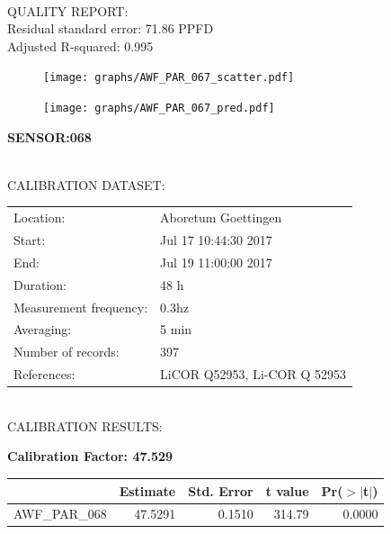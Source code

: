 \documentclass[oneside]{report}
\begin{document}
\hrulefill\\
QUALITY REPORT:\\
Residual standard error: 71.86 PPFD\\
Adjusted R-squared: 0.995



\begin{figure}[H]
  \centering
  \texttt{[image: graphs/AWF\_PAR\_067\_scatter.pdf]}
\end{figure}




\begin{figure}[H]
  \centering
  \texttt{[image: graphs/AWF\_PAR\_067\_pred.pdf]}
\end{figure}

\pagebreak


\begin{center}
\large{\textbf{SENSOR:068}}\\
\end{center}

\hrulefill\\
CALIBRATION DATASET:\\
\begin{table}[h!]
  \centering
  \label{tab:table1}
  \begin{tabular}{ll}
    Location: & Aboretum Goettingen\\ 
    
    
    Start:  & Jul 17 10:44:30 2017 \\
    End:   & Jul 19 11:00:00 2017\\ 
    Duration: & 48 h\\
    Measurement frequency: & 0.3hz\\
    Averaging:  &5 min\\
    Number of records: & 397 \\
    References: & LiCOR Q52953, Li-COR Q 52953 \\
  \end{tabular}
\end{table}

\hrulefill\\
CALIBRATION RESULTS:\\


\begin{center}
\textbf{\large{Calibration Factor: 47.529}}\\
\end{center}
\begin{table}[ht]
\centering
\begin{tabular}{rrrrr}
  \hline
 & Estimate & Std. Error & t value & Pr($>$$|$t$|$) \\ 
  \hline
AWF\_PAR\_068 & 47.5291 & 0.1510 & 314.79 & 0.0000 \\ 
   \hline
\end{tabular}
\end{table}
\end{document}
